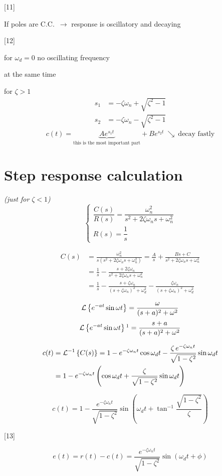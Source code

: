 \documentclass[11pt,a4paper]{article}
\begin{document}
[11]

If poles are C.C.\ $\to$ response is oscillatory and decaying

[12]

for  $\omega_d=0$ \quad no oscillating frequency

 at the same time

for $\zeta>1$
\begin{align*}
s_1&=-\zeta\omega_n+\sqrt{\zeta^2-1}\\
s_2&=-\zeta\omega_n-\sqrt{\zeta^2-1}
\end{align*}
\[
c(t)=\underbrace{Ae^{s_1t}}_{\text{this is the most important part}}+Be^{s_2t}\ \searrow\ \text{decay fastly}
\]

\section{Step response calculation}
\textit{(just for $\zeta<1$)}
\[
\left\{\begin{array}{l}\dfrac{C(s)}{R(s)}=\dfrac{\omega_n^2}{s^2+2\zeta\omega_n s+\omega_n^2}\\[6pt] R(s)=\dfrac{1}{s}\end{array}\right.
\]

\begin{align*}
C(s)&=\frac{\omega_n^2}{s\left(s^2+2\zeta\omega_n s+\omega_n^2\right)}=\frac{A}{s}+\frac{Bs+C}{s^2+2\zeta\omega_n s+\omega_n^2}\\
&=\frac{1}{s}-\frac{s+2\zeta\omega_n}{s^2+2\zeta\omega_n s+\omega_n^2}\\
&=\frac{1}{s}-\frac{s+\zeta\omega_n}{(s+\zeta\omega_n)^2+\omega_d^2}-\frac{\zeta\omega_n}{(s+\zeta\omega_n)^2+\omega_d^2}
\end{align*}

 \quad {}

\[
\mathcal{L}\left\{e^{-at}\sin\omega t\right\}=\frac{\omega}{(s+a)^2+\omega^2}
\]
\[
\Lap{e^{-at}\sin\omega t}\footnotemark=\frac{s+a}{(s+a)^2+\omega^2}
\]

\begin{align*}
c(t)&=\mathcal{L}^{-1}\left\{C(s)\right\}=1-e^{-\zeta\omega_n t}\cos\omega_d t-\frac{\zeta\,e^{-\zeta\omega_n t}}{\sqrt{1-\zeta^2}}\sin\omega_d t\\
&=1-e^{-\zeta\omega_n t}\left(\cos\omega_d t+\frac{\zeta}{\sqrt{1-\zeta^2}}\sin\omega_d t\right)
\end{align*}

\[
c(t)=1-\frac{e^{-\zeta\omega_n t}}{\sqrt{1-\zeta^2}}\sin\left(\omega_d t+\tan^{-1}\frac{\sqrt{1-\zeta^2}}{\zeta}\right)
\]

[13]

\[
e(t)=r(t)-c(t)=\frac{e^{-\zeta\omega_n t}}{\sqrt{1-\zeta^2}}\sin\left(\omega_d t+\phi\right)
\]
\end{document}

